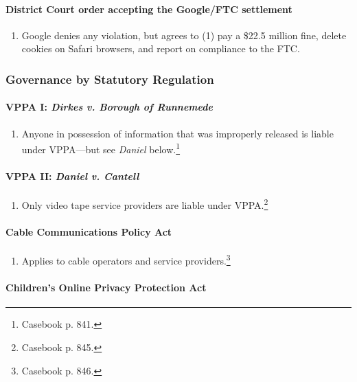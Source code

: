\paragraph{District Court order accepting the Google/FTC settlement}

\begin{enumerate}
    \item Google denies any violation, but agrees to (1) pay a \$22.5 million 
    fine, delete cookies on Safari browsers, and report on compliance to the 
    FTC.
\end{enumerate}

\subsubsection{Governance by Statutory Regulation}

\paragraph{VPPA I: \emph{Dirkes v. Borough of Runnemede}}

\begin{enumerate}
    \item Anyone in possession of information that was improperly released is 
    liable under VPPA---but see \emph{Daniel} below.\footnote{Casebook p. 841.}
\end{enumerate}

\paragraph{VPPA II: \emph{Daniel v. Cantell}}

\begin{enumerate}
    \item Only video tape service providers are liable under 
    VPPA.\footnote{Casebook p. 845.}
\end{enumerate}

\paragraph{Cable Communications Policy Act}

\begin{enumerate}
    \item Applies to cable operators and service providers.\footnote{Casebook p. 
    846.}
\end{enumerate}

\paragraph{Children's Online Privacy Protection Act}

